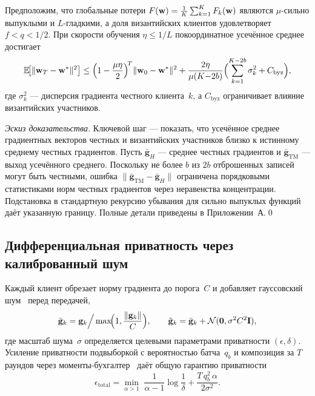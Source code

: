 \begin{theorem}
\label{thm:fed_conv}
Предположим, что глобальные потери $F(\mathbf{w})=\frac{1}{K}\sum_{k=1}^K F_k(\mathbf{w})$ являются $\mu$-сильно выпуклыми и $L$-гладкими, а доля византийских клиентов удовлетворяет $f<q<1/2$. При скорости обучения $\eta\le 1/L$ покоординатное усечённое среднее достигает
\begin{equation}
\mathbb{E}\!\bigl[\|\mathbf{w}_T-\mathbf{w}^*\|^2\bigr]
\le \Bigl(1-\frac{\mu\eta}{2}\Bigr)^{\!T}\|\mathbf{w}_0-\mathbf{w}^*\|^2
  + \frac{2\eta}{\mu(K{-}2b)}
    \Bigl(\sum_{k=1}^{K-2b}\sigma_k^2 + C_{\mathrm{byz}}\Bigr),
\label{eq:fed_conv_bound}
\end{equation}
где $\sigma_k^2$ --- дисперсия градиента честного клиента~$k$, а $C_{\mathrm{byz}}$ ограничивает влияние византийских участников.
\end{theorem}

\noindent\textit{Эскиз доказательства.} Ключевой шаг --- показать, что усечённое среднее градиентных векторов честных и византийских участников близко к истинному среднему честных градиентов. Пусть $\bar{\mathbf{g}}_H$ --- среднее честных градиентов и $\bar{\mathbf{g}}_{\mathrm{TM}}$ --- выход усечённого среднего. Поскольку не более $b$ из $2b$ отброшенных записей могут быть честными, ошибка $\|\bar{\mathbf{g}}_{\mathrm{TM}}-\bar{\mathbf{g}}_H\|$ ограничена порядковыми статистиками норм честных градиентов через неравенства концентрации. Подстановка в стандартную рекурсию убывания для сильно выпуклых функций даёт указанную границу. Полные детали приведены в Приложении~А.\qed

\subsection{Дифференциальная приватность через калиброванный шум}

Каждый клиент обрезает норму градиента до порога~$C$ и добавляет гауссовский шум~\cite{Abadi2016,Dwork2006,Dwork2014} перед передачей,
\begin{equation}
\bar{\mathbf{g}}_k = \mathbf{g}_k\Big/\max\!\Bigl(1,\frac{\|\mathbf{g}_k\|}
{C}\Bigr),
\qquad
\tilde{\mathbf{g}}_k = \bar{\mathbf{g}}_k + \mathcal{N}(\mathbf{0},\sigma^2 C^2\mathbf{I}),
\label{eq:fed_dp_noise}
\end{equation}
где масштаб шума~$\sigma$ определяется целевыми параметрами приватности $(\epsilon,\delta)$. Усиление приватности подвыборкой с вероятностью батча~$q_b$ и композиция за $T$ раундов через моменты-бухгалтер~\cite{Mironov2017,Balle2018} даёт общую гарантию приватности
\begin{equation}
\epsilon_{\mathrm{total}}
= \min_{\alpha>1}\;
  \frac{1}{\alpha-1}\log\frac{1}{\delta}
  + \frac{T\,q_b^2\,\alpha}{2\sigma^2}.
\label{eq:fed_privacy}
\end{equation}

